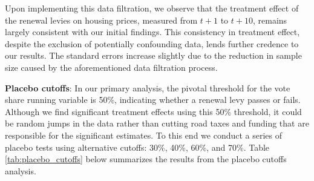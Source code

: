 Upon implementing this data filtration, we observe that the treatment effect of the renewal levies on housing prices, measured from $t+1$ to $t+10$, remains largely consistent with our initial findings. This consistency in treatment effect, despite the exclusion of potentially confounding data, lends further credence to our results. The standard errors increase slightly due to the reduction in sample size caused by the aforementioned data filtration process. 

\textbf{Placebo cutoffs}: In our primary analysis, the pivotal threshold for the vote share running variable is 50\%, indicating whether a renewal levy passes or fails.  Although we find significant treatment effects using this 50\% threshold, it could be random jumps in the data rather than cutting road taxes and funding that are responsible for the significant estimates.  To this end we conduct a series of placebo tests using alternative cutoffs: 30\%, 40\%, 60\%, and 70\%. Table \ref{tab:placebo_cutoffs} below summarizes the results from the placebo cutoffs analysis. 

